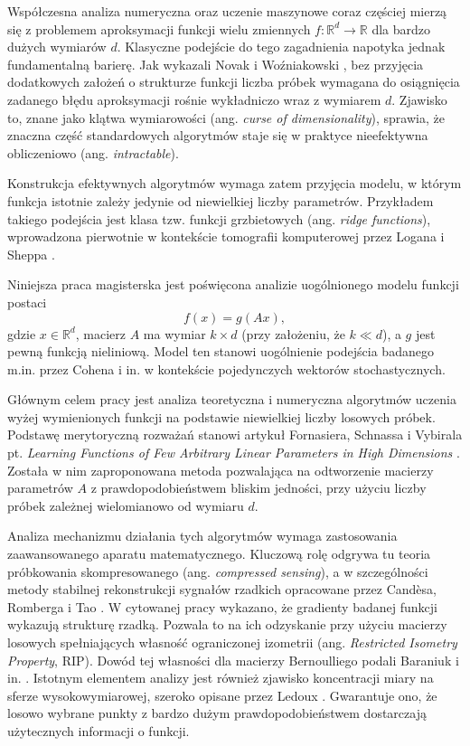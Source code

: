 Współczesna analiza numeryczna oraz uczenie maszynowe coraz częściej mierzą się z problemem aproksymacji funkcji wielu zmiennych $f: \mathbb{R}^d \to \mathbb{R}$ dla bardzo dużych wymiarów $d$. Klasyczne podejście do tego zagadnienia napotyka jednak fundamentalną barierę. Jak wykazali Novak i Woźniakowski \cite{novak2008tractability}, bez przyjęcia dodatkowych założeń o strukturze funkcji liczba próbek wymagana do osiągnięcia zadanego błędu aproksymacji rośnie wykładniczo wraz z wymiarem $d$. Zjawisko to, znane jako klątwa wymiarowości (ang. \textit{curse of dimensionality}), sprawia, że znaczna część standardowych algorytmów staje się w praktyce nieefektywna obliczeniowo (ang. \textit{intractable}).

Konstrukcja efektywnych algorytmów wymaga zatem przyjęcia modelu, w którym funkcja istotnie zależy jedynie od niewielkiej liczby parametrów. Przykładem takiego podejścia jest klasa tzw. funkcji grzbietowych (ang. \textit{ridge functions}), wprowadzona pierwotnie w kontekście tomografii komputerowej przez Logana i Sheppa \cite{logan1975optimal}.

Niniejsza praca magisterska jest poświęcona analizie uogólnionego modelu funkcji postaci
$$f(x) = g(Ax),$$
gdzie $x \in \mathbb{R}^d$, macierz $A$ ma wymiar $k \times d$ (przy założeniu, że $k \ll d$), a $g$ jest pewną funkcją nieliniową. Model ten stanowi uogólnienie podejścia badanego m.in. przez Cohena i in. \cite{cohen2011capturing} w kontekście pojedynczych wektorów stochastycznych.

Głównym celem pracy jest analiza teoretyczna i numeryczna algorytmów uczenia wyżej wymienionych funkcji na podstawie niewielkiej liczby losowych próbek. Podstawę merytoryczną rozważań stanowi artykuł Fornasiera, Schnassa i Vybirala pt. \textit{Learning Functions of Few Arbitrary Linear Parameters in High Dimensions} \cite{fornasier2012learning}. Została w nim zaproponowana metoda pozwalająca na odtworzenie macierzy parametrów $A$ z prawdopodobieństwem bliskim jedności, przy użyciu liczby próbek zależnej wielomianowo od wymiaru $d$.

Analiza mechanizmu działania tych algorytmów wymaga zastosowania zaawansowanego aparatu matematycznego. Kluczową rolę odgrywa tu teoria próbkowania skompresowanego (ang. \textit{compressed sensing}), a w szczególności metody stabilnej rekonstrukcji sygnałów rzadkich opracowane przez Candèsa, Romberga i Tao \cite{candes2006stable}. W cytowanej pracy wykazano, że gradienty badanej funkcji wykazują strukturę rzadką. Pozwala to na ich odzyskanie przy użyciu macierzy losowych spełniających własność ograniczonej izometrii (ang. \textit{Restricted Isometry Property}, RIP). Dowód tej własności dla macierzy Bernoulliego podali Baraniuk i in. \cite{baraniuk2008simple}. Istotnym elementem analizy jest również zjawisko koncentracji miary na sferze wysokowymiarowej, szeroko opisane przez Ledoux \cite{ledoux2001concentration}. Gwarantuje ono, że losowo wybrane punkty z bardzo dużym prawdopodobieństwem dostarczają użytecznych informacji o funkcji.

